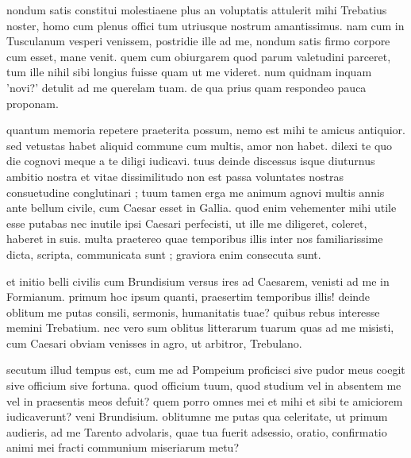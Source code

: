 


 nondum satis constitui molestiaene plus an voluptatis attulerit mihi Trebatius noster, homo cum plenus offici tum utriusque nostrum amantissimus. nam cum in Tusculanum vesperi venissem, postridie ille ad me, nondum satis firmo corpore cum esset, mane venit. quem cum obiurgarem quod parum valetudini parceret, tum ille nihil sibi longius fuisse quam ut me videret. num quidnam inquam 'novi?' detulit ad me querelam tuam. de qua prius quam respondeo pauca proponam.

 quantum memoria repetere praeterita possum, nemo est mihi te amicus antiquior. sed vetustas habet aliquid commune cum multis, amor non habet. dilexi te quo die cognovi meque a te diligi iudicavi. tuus deinde discessus isque diuturnus ambitio nostra et vitae dissimilitudo non est passa voluntates nostras consuetudine conglutinari ; tuum tamen erga me animum agnovi multis annis ante bellum civile, cum Caesar esset in Gallia. quod enim vehementer mihi utile esse putabas nec inutile ipsi Caesari perfecisti, ut ille me diligeret, coleret, haberet in suis. multa praetereo quae temporibus illis inter nos familiarissime dicta, scripta, communicata sunt ; graviora enim consecuta sunt.

 et initio belli civilis cum Brundisium versus ires ad Caesarem, venisti ad me in Formianum. primum hoc ipsum quanti, praesertim temporibus illis! deinde oblitum me putas consili, sermonis, humanitatis tuae? quibus rebus interesse memini Trebatium. nec vero sum oblitus litterarum tuarum quas ad me misisti, cum Caesari obviam venisses in agro, ut arbitror, Trebulano.

 secutum illud tempus est, cum me ad Pompeium proficisci sive pudor meus coegit sive officium sive fortuna. quod officium tuum, quod studium vel in absentem me vel in praesentis meos defuit? quem porro omnes mei et mihi et sibi te amiciorem iudicaverunt? veni Brundisium. oblitumne me putas qua celeritate, ut primum audieris, ad me Tarento advolaris, quae tua fuerit adsessio, oratio, confirmatio animi mei fracti communium miseriarum metu?

